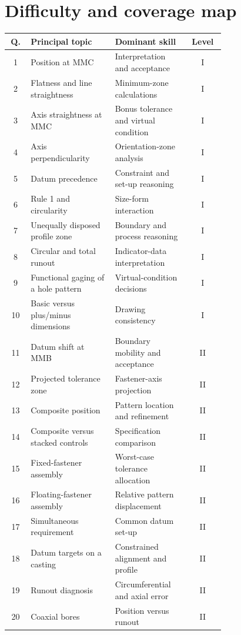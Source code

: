 \documentclass[11pt,a4paper]{article}
\renewcommand{\arraystretch}{1.14}
\begin{document}
\section*{Difficulty and coverage map}
\begingroup
\renewcommand{\arraystretch}{1.00}
\small
\begin{longtable}{@{}c p{0.39\linewidth} p{0.34\linewidth} c@{}}
\toprule
\textbf{Q.} & \textbf{Principal topic} & \textbf{Dominant skill} & \textbf{Level}\\
\midrule
\endhead
1 & Position at MMC & Interpretation and acceptance & I\\
2 & Flatness and line straightness & Minimum-zone calculations & I\\
3 & Axis straightness at MMC & Bonus tolerance and virtual condition & I\\
4 & Axis perpendicularity & Orientation-zone analysis & I\\
5 & Datum precedence & Constraint and set-up reasoning & I\\
6 & Rule 1 and circularity & Size-form interaction & I\\
7 & Unequally disposed profile zone & Boundary and process reasoning & I\\
8 & Circular and total runout & Indicator-data interpretation & I\\
9 & Functional gaging of a hole pattern & Virtual-condition decisions & I\\
10 & Basic versus plus/minus dimensions & Drawing consistency & I\\
11 & Datum shift at MMB & Boundary mobility and acceptance & II\\
12 & Projected tolerance zone & Fastener-axis projection & II\\
13 & Composite position & Pattern location and refinement & II\\
14 & Composite versus stacked controls & Specification comparison & II\\
15 & Fixed-fastener assembly & Worst-case tolerance allocation & II\\
16 & Floating-fastener assembly & Relative pattern displacement & II\\
17 & Simultaneous requirement & Common datum set-up & II\\
18 & Datum targets on a casting & Constrained alignment and profile & II\\
19 & Runout diagnosis & Circumferential and axial error & II\\
20 & Coaxial bores & Position versus runout & II\\

\end{longtable}
\end{document}
